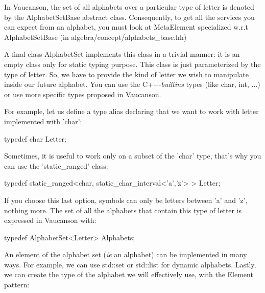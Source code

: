 \documentclass{article}
\begin{document}
\hspace{1cm}

In Vaucanson, the set of all alphabets over a particular type of
letter is denoted by the AlphabetSetBase abstract class. Consequently,
to get all the services you can expect from an alphabet, you must look
at MetaElement specialized w.r.t AlphabetSetBase (in
algebra/concept/alphabets\_base.hh)

A final class AlphabetSet implements this class in a trivial manner:
it is an empty class only for static typing purpose. This class is
just parameterized by the type of letter. So, we have to provide the
kind of letter we wish to manipulate inside our future alphabet. You
can use the C++-\textit{builtins} types (like char, int, ...)  or use
more specific types proposed in Vaucanson.

For example, let us define a type alias declaring that we want to work
with letter implemented with 'char':

\begin{code}
typedef char Letter;
\end{code}

Sometimes, it is useful to work only on a subset of the 'char' type,
that's why you can use the 'static\_ranged' class:

\begin{code}
typedef static_ranged<char, static_char_interval<'a','z'> >  Letter;
\end{code}

If you choose this last option, symbols can only be letters between
'a' and 'z', nothing more. The set of all the alphabets that contain
this type of letter is expressed in Vaucanson with:

\begin{code}
typedef AlphabetSet<Letter>  Alphabets;
\end{code}

An element of the alphabet set (\textit{ie} an alphabet) can be
implemented in many ways. For example, we can use std::set or
std::list for dynamic alphabets. Lastly, we can create the type of
the alphabet we will effectively use, with the Element pattern:
\end{document}
